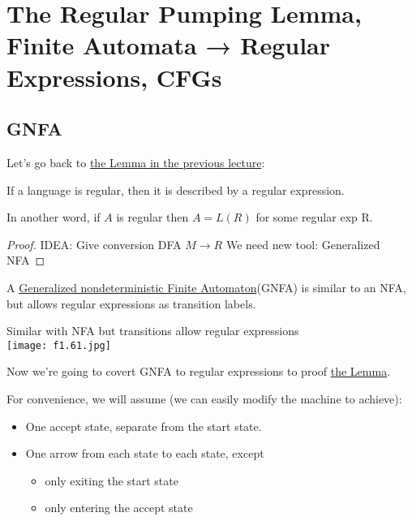 \chapter{The Regular Pumping Lemma, Finite Automata → Regular Expressions, CFGs}

\section{GNFA}

Let's go back to \hyperref[lemma: 2.2]{the Lemma in the previous lecture}:
\begin{theorem}
    If a language is regular, then it is described by a regular expression.

    In another word, if \(A\) is regular then \(A = L(R)\) for some regular exp R.  
\end{theorem}
\begin{proof}
    IDEA: Give conversion DFA \(M \rightarrow R\) 
    We need new tool: Generalized NFA
\end{proof}

\begin{definition}
    A \underline{Generalized nondeterministic Finite Automaton}(GNFA) is similar to an NFA, but allows regular expressions as transition labels.
\end{definition}
\begin{eg}
    Similar with NFA but transitions allow regular expressions\\
    \texttt{[image: f1.61.jpg]}
\end{eg}

Now we're going to covert GNFA to regular expressions to proof \hyperref[lemma: 2.2]{the Lemma}.

For convenience, we will assume (we can easily modify the machine to achieve):
\begin{itemize}
    \item One accept state, separate from the start state.
    \item One arrow from each state to each state, except
    \begin{itemize}
        \item only exiting the start state
        \item only entering the accept state
    \end{itemize}
\end{itemize}


